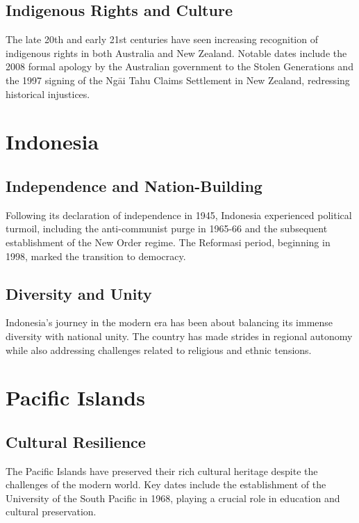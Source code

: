 \documentclass[a4paper,12pt]{book}
\begin{document}
\subsection{Indigenous Rights and Culture}
\label{subsec:indigenous-rights-culture}
The late 20th and early 21st centuries have seen increasing recognition of indigenous rights in both Australia and New Zealand. Notable dates include the 2008 formal apology by the Australian government to the Stolen Generations and the 1997 signing of the Ngāi Tahu Claims Settlement in New Zealand, redressing historical injustices.

\section{Indonesia}
\label{sec:indonesia}

\subsection{Independence and Nation-Building}
\label{subsec:independence-nation-building}
Following its declaration of independence in 1945, Indonesia experienced political turmoil, including the anti-communist purge in 1965-66 and the subsequent establishment of the New Order regime. The Reformasi period, beginning in 1998, marked the transition to democracy.

\subsection{Diversity and Unity}
\label{subsec:diversity-unity}
Indonesia’s journey in the modern era has been about balancing its immense diversity with national unity. The country has made strides in regional autonomy while also addressing challenges related to religious and ethnic tensions.

\section{Pacific Islands}
\label{sec:pacific-islands}

\subsection{Cultural Resilience}
\label{subsec:cultural-resilience}
The Pacific Islands have preserved their rich cultural heritage despite the challenges of the modern world. Key dates include the establishment of the University of the South Pacific in 1968, playing a crucial role in education and cultural preservation.
\end{document}
